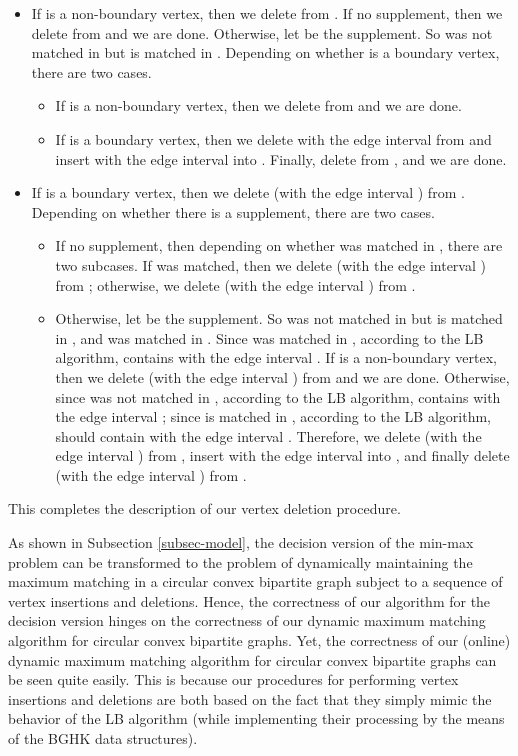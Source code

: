 \documentclass[11pt]{article}
\begin{document}
\begin{itemize}
\item If  is a non-boundary vertex, then we delete  from
. If no supplement, then we delete  from  and we
are done. Otherwise, let  be the supplement. So  was not
matched in  but is matched in .
Depending on whether  is a boundary vertex, there are two cases.

\begin{itemize}
\item If  is a non-boundary vertex, then we delete  from
 and we are done.

\item If  is a boundary vertex, then we delete  with the edge interval
 from  and insert  with the edge interval
 into
. Finally, delete  from , and we are done.

\end{itemize}

\item If  is a boundary vertex, then we delete  (with the edge interval
) from . Depending on whether there is
a supplement, there are two cases.

\begin{itemize}
\item
If no supplement, then depending on whether  was matched in
, there are two subcases. If  was matched, then we
delete  (with the edge interval ) from ;
otherwise, we delete  (with the edge interval ) from .


\item Otherwise, let  be the supplement.
So  was not matched in  but is matched in , and
 was matched in .
Since  was matched in , according to the LB algorithm,
 contains  with the edge interval .
If  is a non-boundary vertex, then we delete  (with the edge interval
) from  and we are done.
Otherwise, since  was not matched in , according to the LB
algorithm,  contains  with the edge interval ;
since  is matched in , according to the LB
algorithm,  should contain  with the edge interval
. Therefore,
we delete  (with the edge interval ) from ,
insert  with the edge interval  into , and finally
delete  (with the edge interval ) from .
\end{itemize}
\end{itemize}

This completes the description of our vertex deletion procedure.

As shown in Subsection \ref{subsec-model}, the decision version of the min-max problem
can be transformed to the problem of dynamically maintaining the maximum matching
in a circular convex bipartite graph subject to a sequence of vertex insertions and deletions.
Hence, the correctness of our algorithm for the decision version hinges on the correctness
of our dynamic maximum matching algorithm for circular convex bipartite graphs.
Yet, the correctness of our (online) dynamic maximum matching algorithm for circular
convex bipartite graphs can be seen quite easily. This is because our procedures
for performing vertex insertions and deletions are both based on the fact that
they simply mimic the behavior of the LB algorithm (while
implementing their processing by the means of the BGHK data structures).
\end{document}
